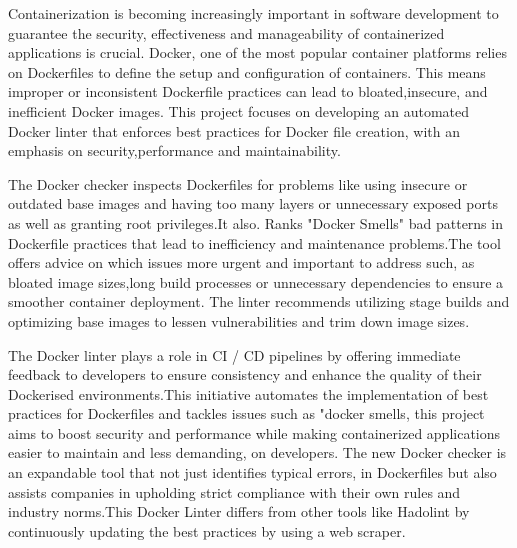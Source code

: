 Containerization is becoming increasingly important in software development to guarantee the security, effectiveness and manageability of containerized applications is crucial. Docker, one of the most popular container platforms relies on Dockerfiles to define the setup and configuration of containers. This means improper or inconsistent Dockerfile practices can lead to bloated,insecure, and inefficient Docker images. This project focuses on developing an automated Docker linter that enforces best practices for Docker file creation, with an emphasis on security,performance and maintainability. 

The Docker checker inspects Dockerfiles for problems like using insecure or outdated base images and having too many layers or unnecessary exposed ports as well as granting root privileges.It also. Ranks "Docker Smells" bad patterns in Dockerfile practices that lead to inefficiency and maintenance problems.The tool offers advice on which issues more urgent and important to address such, as bloated image sizes,long build processes or unnecessary dependencies to ensure a smoother container deployment. The linter recommends utilizing stage builds and optimizing base images to lessen vulnerabilities and trim down image sizes. 

The Docker linter plays a role in CI / CD pipelines by offering immediate feedback to developers to ensure consistency and enhance the quality of their Dockerised environments.This initiative automates the implementation of best practices for Dockerfiles and tackles issues such as "docker smells, this project aims to boost security and performance while making containerized applications easier to maintain and less demanding, on developers.  The new Docker checker is an expandable tool that not just identifies typical errors, in Dockerfiles but also assists companies in upholding strict compliance with their own rules and industry norms.This Docker Linter differs from other tools like Hadolint by continuously updating the best practices by using a web scraper. 